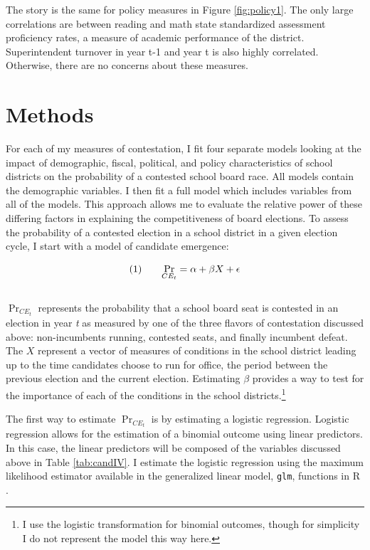 The story is the same for policy measures in Figure \ref{fig:policy1}. The only 
large correlations are between reading and math state standardized assessment 
proficiency rates, a measure of academic performance of the district. Superintendent 
turnover in year t-1 and year t is also highly correlated. Otherwise, there 
are no concerns about these measures. 



\section{Methods}

For each of my measures of contestation, I fit four separate models 
looking at the impact of demographic, fiscal, political, and policy characteristics 
of school districts on the probability of a contested school board race. All models 
contain the demographic variables. I then fit a full model which includes variables 
from all of the models. This approach allows me to evaluate the relative power of 
these differing factors in explaining the competitiveness of board elections. 
To assess the probability of a contested election in a school district in a given 
election cycle, I start with a model of candidate emergence:

\[ (1) \hspace{0.25 in}  \Pr_{CE_{t}} = \alpha + \beta X + \epsilon \] \\

$\Pr_{CE_{t}}$ represents the probability that a school board seat is contested 
in an election in year \emph{t} as measured by one of the three flavors of contestation 
discussed above: non-incumbents running, contested seats, and finally incumbent defeat. 
The $X$ represent a vector of measures of conditions 
in the school district leading up to the time candidates choose to run for office, 
the period between the previous election and the current election. Estimating 
$\beta$ provides a way to test for the importance of each of the conditions in 
the school districts.\footnote{I use the logistic transformation for binomial 
outcomes, though for simplicity I do not represent the model this way here.}

The first way to estimate $\Pr_{CE_{t}}$ is by estimating a logistic regression. 
Logistic regression allows for the estimation of a binomial outcome using linear 
predictors. In this case, the linear predictors will be composed of the variables 
discussed above in Table \ref{tab:candIV}. I estimate the logistic regression using 
the maximum likelihood estimator available in the generalized linear model,  
\texttt{glm}, functions in R \citep{cran}. 

